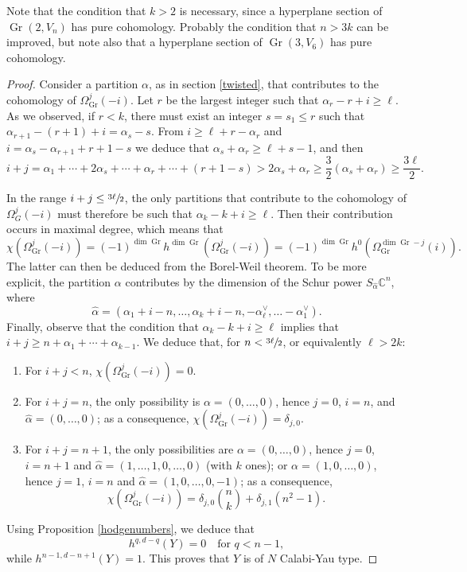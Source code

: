 \documentclass[JEP,XML,SOM,Unicode,NoEqCountersInSection]{cedram}
\theoremstyle{plain}
\theoremstyle{definition}
\DeclareMathOperator{\Gr}{Gr}
\newcommand{\CC}{\mathbb{C}}
\begin{document}
Note that the condition that $k>2$ is necessary, since a hyperplane section of $\Gr(2,V_n)$
has pure cohomology. Probably the condition that $n>3k$ can be improved, but note also that a
hyperplane section of $\Gr(3,V_6)$ has pure cohomology.

\begin{proof}
Consider a partition $\alpha$, as in section \ref{twisted}, that contributes to the
cohomology of $\Omega^j_{\Gr}(-i)$. Let $r$ be the
largest integer such that $\alpha_r-r+i\ge \ell$. As we observed, if $r<k$, there must
exist an integer $s=s_1\le r$ such that $\alpha_{r+1}-(r+1)+i=\alpha_{s}-s$.
From $i\ge \ell+r-\alpha_r$ and $i=\alpha_s-\alpha_{r+1}+r+1-s$ we deduce
that $\alpha_s+\alpha_r\ge \ell+s-1$, and then
\[
i+j =\alpha_1+\cdots +2\alpha_s+\cdots +\alpha_r+\cdots +(r+1-s)>2\alpha_s+\alpha_r\ge \frac{3}{2}(\alpha_s+\alpha_r)
\ge \frac{3\ell}{2}.
\]

In the range $i+j\le \sfrac{3\ell}{2}$, the only partitions that contribute to the cohomology of
$\Omega_G^j(-i)$ must therefore be such that $\alpha_k-k+i\ge \ell$. Then their contribution
occurs in maximal degree, which means that
\[
\chi(\Omega_{\Gr}^j(-i))=(-1)^{\dim {\Gr}}h^{\dim {\Gr}}(\Omega_{\Gr}^j(-i))=(-1)^{\dim {\Gr}}h^0(\Omega_{\Gr}^{\dim {\Gr}-j}(i)).
\]
The latter can then be deduced from the Borel-Weil theorem. To be more explicit, the partition
$\alpha$ contributes by the dimension of the Schur power $S_{\hat{\alpha}}\CC^n$,
where
\[
\hat{\alpha} = (\alpha_1+i-n,\ldots ,\alpha_k+i-n,-\alpha_\ell^\vee, \ldots -\alpha_1^\vee).
\] Finally, observe that the condition that
$\alpha_k-k+i\ge \ell$ implies that $i+j\ge n+\alpha_1+\cdots +\alpha_{k-1}$. We deduce
that, for $n<\sfrac{3\ell}{2}$, or equivalently $\ell >2k$:
\begin{enumerate}
\item For $i+j<n$, $\chi(\Omega_{\Gr}^j(-i))=0$.
\item For $i+j=n$, the only possibility is $\alpha = (0,\ldots ,0)$, hence $j=0$, $i=n$, and $\hat{\alpha}=(0,\ldots ,0)$; as a consequence, $\chi(\Omega_{\Gr}^j(-i))=\delta_{j,0}$.
\item For $i+j=n+1$, the only possibilities are $\alpha = (0,\ldots ,0)$, hence $j=0$, $i=n+1$
and $\hat{\alpha}=(1,\ldots ,1,0,\ldots ,0)$ (with $k$ ones); or $\alpha = (1,0,\ldots ,0)$,
hence $j=1$, $i=n$ and $\hat{\alpha}=(1,0,\ldots ,0,-1)$; as a consequence,
\[
\chi(\Omega_{\Gr}^j(-i))=\delta_{j,0}\binom{n}{k}+\delta_{j,1}(n^2-1).
\]
\end{enumerate}
Using Proposition \ref{hodgenumbers}, we deduce that
\[
h^{q,d-q}(Y)=0\quad\text{for }q<n-1,
\]
while $h^{n-1,d-n+1}(Y)=1$. This proves that $Y$ is of $N$ Calabi-Yau type.
\end{proof}
\end{document}
